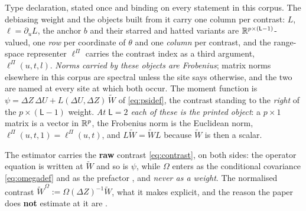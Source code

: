 Type declaration, stated once and binding on every statement in this corpus. The debiasing
weight and the objects built from it carry one column per contrast: $L$, $\ell=\partial_uL$, the
anchor $b$ and their starred and hatted variants are $\mathbb{R}^{p\times(\mathsf L-1)}$-valued, one
\emph{row} per coordinate of $\theta$ and one \emph{column} per contrast, and the range-space
representer $\ell^\Pi$ carries the contrast index as a third argument,
$\ell^\Pi(u,t,l)$. \emph{Norms carried by these objects are Frobenius}; matrix norms elsewhere in this
corpus are spectral unless the site says otherwise, and the two are named at every site at which both
occur. The moment function is
$\psi=\Delta Z\,\Delta U+L(\Delta U,\Delta Z)\,\widetilde W$ of \eqref{eq:psidef}, the contrast standing
to the \emph{right} of the $p\times(\mathsf L-1)$ weight. \emph{At $\mathsf L=2$ each of these is the
printed object}: a
$p\times1$ matrix is a vector in $\mathbb{R}^{p}$, the Frobenius norm is the Euclidean norm,
$\ell^\Pi(u,t,1)=\ell^\Pi(u,t)$, and $L\widetilde W=\widetilde WL$ because $\widetilde W$ is then a
scalar.

The estimator carries the \textbf{raw} contrast \eqref{eq:contrast}, on both sides: the operator
equation is written at $\widetilde W$ and so is $\psi$, while $\Omega$ enters as the conditional
covariance \eqref{eq:omegadef} and as the prefactor , and \emph{never as a weight}.
The normalised contrast $\widetilde W^{\Omega}:=\Omega(\Delta Z)^{-1}\widetilde W$, what it makes
explicit, and the reason the paper does \textbf{not} estimate at it are .

